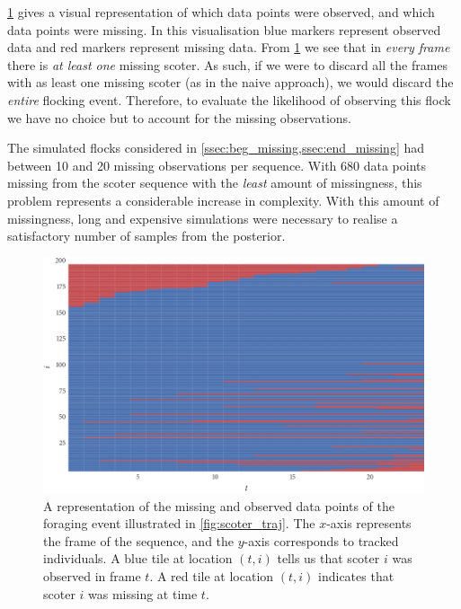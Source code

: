 \cref{fig:scoter_missing} gives a visual representation of which data points
were observed, and which data points were missing. In this visualisation blue
markers represent observed data and red markers represent missing data. From
\cref{fig:scoter_missing} we see that in \emph{every frame} there is \emph{at
least one} missing scoter. As such, if we were to discard all the frames with
as least one missing scoter (as in the naive approach), we would discard the
\emph{entire} flocking event. Therefore, to evaluate the likelihood of observing
this flock we have no choice but to account for the missing observations.

The simulated flocks considered in \cref{ssec:beg_missing,ssec:end_missing} had
between 10 and 20 missing observations per sequence. With 680 data points
missing from the scoter sequence with the \emph{least} amount of missingness,
this problem represents a considerable increase in complexity. With this amount
of missingness, long and expensive simulations were necessary to realise a
satisfactory number of samples from the posterior.

\begin{figure}[tb]
  \includegraphics{data_00_missing.pdf}
  \caption{A representation of the missing and observed data points of the
    foraging event illustrated in \cref{fig:scoter_traj}. The $x$-axis
    represents the frame of the sequence, and the $y$-axis corresponds to
    tracked individuals. A blue tile at location $(t, i)$ tells us that scoter
    $i$ was observed in frame $t$. A red tile at location $(t, i)$ indicates
    that scoter $i$ was missing at time $t$.}
  \label{fig:scoter_missing}
\end{figure}

